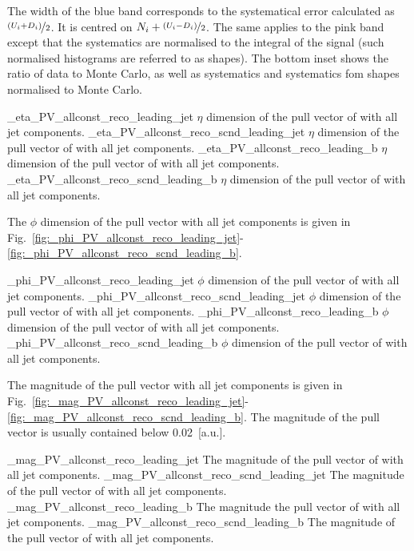 The width of the blue band corresponds to the systematical error calculated as $\nicefrac{(U_{i}+D_{i})}{2}$. It is centred on $N_{i}+\nicefrac{(U_{i}-D_{i})}{2}$. The same applies to the pink band except that the systematics are normalised to the integral of the signal (such normalised histograms are referred to as shapes). The bottom inset shows the ratio of data to Monte Carlo, as well as systematics and systematics fom shapes normalised to Monte Carlo.

          {_eta_PV_allconst_reco_leading_jet}
          {$\eta$ dimension of the pull vector of \leadingjet with all jet components.}
          {_eta_PV_allconst_reco_scnd_leading_jet}
          {$\eta$ dimension of the pull vector of \scndleadingjet with all jet components.}
          {_eta_PV_allconst_reco_leading_b}
          {$\eta$ dimension of the pull vector of \leadingb with all jet components.}
          {_eta_PV_allconst_reco_scnd_leading_b}
          {$\eta$ dimension of the pull vector of \scndleadingb with all jet components.}

The $\phi$ dimension of the pull vector with all jet components is given in Fig.~\ref{fig:_phi_PV_allconst_reco_leading_jet}-\ref{fig:_phi_PV_allconst_reco_scnd_leading_b}. 

          {_phi_PV_allconst_reco_leading_jet}
          {$\phi$ dimension of the pull vector of \leadingjet with all jet components.}
          {_phi_PV_allconst_reco_scnd_leading_jet}
          {$\phi$ dimension of the pull vector of \scndleadingjet with all jet components.}
          {_phi_PV_allconst_reco_leading_b}
          {$\phi$ dimension of the pull vector of \leadingb with all jet components.}
          {_phi_PV_allconst_reco_scnd_leading_b}
          {$\phi$ dimension of the pull vector of \scndleadingb with all jet components.}

The magnitude of the pull vector with all jet components is given in Fig.~\ref{fig:_mag_PV_allconst_reco_leading_jet}-\ref{fig:_mag_PV_allconst_reco_scnd_leading_b}. The magnitude of the pull vector is usually contained below 0.02~[a.u.].

          {_mag_PV_allconst_reco_leading_jet}
          {The magnitude of the pull vector of \leadingjet with all jet components.}
          {_mag_PV_allconst_reco_scnd_leading_jet}
          {The magnitude of the pull vector of \scndleadingjet with all jet components.}
          {_mag_PV_allconst_reco_leading_b}
          {The magnitude the pull vector of \leadingb with all jet components.}
          {_mag_PV_allconst_reco_scnd_leading_b}
          {The magnitude of the pull vector of \scndleadingb with all jet components.}

